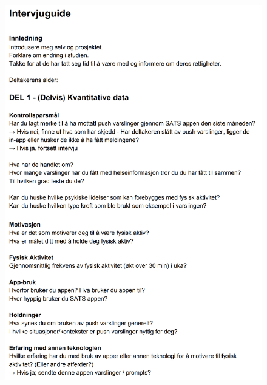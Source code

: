 \begin{figure}
    \centering
    \includegraphics[width=1\textwidth]{images/IG1.png}
\end{figure}

